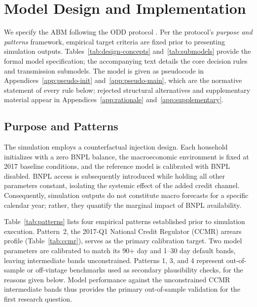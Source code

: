 \section{Model Design and Implementation}
\label{ch:model}

We specify the \ac{ABM} following the \ac{ODD} protocol \cite{grimm2006odd,
grimm2020odd}. Per the protocol's \emph{purpose and patterns} framework, empirical target criteria are fixed prior to presenting simulation outputs.
Tables~\ref{tab:design-concepts} and~\ref{tab:submodels} provide the formal model specification; the accompanying text details the core decision rules and transmission submodels.
The model is given as pseudocode in Appendices~\ref{app:pseudo-init} and~\ref{app:pseudo-main}, which are the normative statement of every rule below; rejected structural alternatives and supplementary material appear in Appendices~\ref{app:rationale} and~\ref{app:supplementary}.

\subsection{Purpose and Patterns}
\label{sec:purpose}

The simulation employs a counterfactual injection design.
Each household initializes with a zero \ac{BNPL} balance, the macroeconomic environment is fixed at 2017 baseline conditions, and the reference model is calibrated with \ac{BNPL} disabled.
\ac{BNPL} access is subsequently introduced while holding all other parameters constant, isolating the systemic effect of the added credit channel.
Consequently, simulation outputs do not constitute macro forecasts for a specific calendar year; rather, they quantify the marginal impact of \ac{BNPL} availability.

Table~\ref{tab:patterns} lists four empirical patterns established prior to simulation execution. Pattern~2, the 2017-Q1 National Credit Regulator (\ac{CCMR}) arrears profile (Table~\ref{tab:ccmr}), serves as the primary calibration target.
Two model parameters are calibrated to match its 90+ day and 1--30 day default bands, leaving intermediate bands unconstrained.
Patterns 1, 3, and 4 represent out-of-sample or off-vintage benchmarks used as secondary plausibility checks, for the reasons given below.
Model performance against the unconstrained \ac{CCMR} intermediate bands thus provides the primary out-of-sample validation for the first research question.

